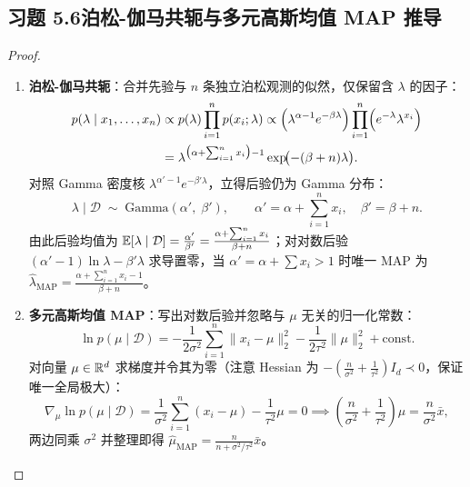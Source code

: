 \subsection*{习题 5.6\quad 泊松-伽马共轭与多元高斯均值 MAP 推导}
\begin{proof}
\begin{enumerate}[label=(\arabic*), leftmargin=1.8em]
  \item \textbf{泊松-伽马共轭}：合并先验与 $n$ 条独立泊松观测的似然，仅保留含 $\lambda$ 的因子：
  \begin{align*}
    p(\lambda \mid x_1, \dots, x_n)
    &\propto p(\lambda)\prod_{i=1}^n p(x_i; \lambda)
     \propto \Bigl(\lambda^{\alpha - 1} e^{-\beta\lambda}\Bigr)
             \prod_{i=1}^n \Bigl(e^{-\lambda}\lambda^{x_i}\Bigr) \\
    &= \lambda^{\bigl(\alpha + \sum_{i=1}^n x_i\bigr) - 1} \exp\!\bigl(-(\beta + n)\lambda\bigr).
  \end{align*}
  对照 Gamma 密度核 $\lambda^{\alpha'-1}e^{-\beta'\lambda}$，立得后验仍为 Gamma 分布：
  \[
    \lambda \mid \mathcal{D} \;\sim\; \mathrm{Gamma}\!\left(\alpha',\; \beta'\right), \qquad
    \alpha' = \alpha + \sum_{i=1}^n x_i,\quad \beta' = \beta + n.
  \]
  由此后验均值为 $\mathbb{E}[\lambda \mid \mathcal{D}] = \frac{\alpha'}{\beta'} = \frac{\alpha + \sum_{i=1}^n x_i}{\beta + n}$；对对数后验 $(\alpha' - 1)\ln\lambda - \beta'\lambda$ 求导置零，当 $\alpha' = \alpha + \sum x_i > 1$ 时唯一 MAP 为 $\hat{\lambda}_{\mathrm{MAP}} = \frac{\alpha + \sum_{i=1}^n x_i - 1}{\beta + n}$。
  \item \textbf{多元高斯均值 MAP}：写出对数后验并忽略与 $\mu$ 无关的归一化常数：
  \[
    \ln p(\mu \mid \mathcal{D})
    = -\frac{1}{2\sigma^2}\sum_{i=1}^n \|x_i - \mu\|_2^2 - \frac{1}{2\tau^2}\|\mu\|_2^2 + \mathrm{const}.
  \]
  对向量 $\mu \in \mathbb{R}^d$ 求梯度并令其为零（注意 Hessian 为 $-(\frac{n}{\sigma^2} + \frac{1}{\tau^2})I_d \prec 0$，保证唯一全局极大）：
  \[
    \nabla_\mu \ln p(\mu \mid \mathcal{D})
    = \frac{1}{\sigma^2}\sum_{i=1}^n (x_i - \mu) - \frac{1}{\tau^2}\mu = 0
    \implies \left(\frac{n}{\sigma^2} + \frac{1}{\tau^2}\right)\mu = \frac{n}{\sigma^2}\bar{x},
  \]
  两边同乘 $\sigma^2$ 并整理即得 $\hat{\mu}_{\mathrm{MAP}} = \frac{n}{n + \sigma^2/\tau^2}\bar{x}$。
\end{enumerate}
\end{proof}

